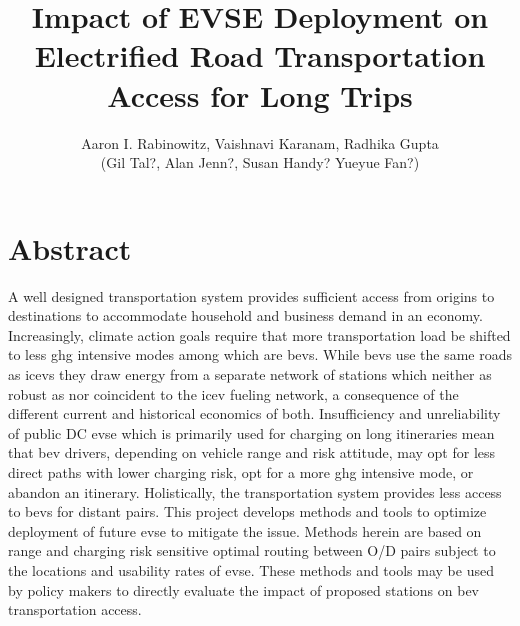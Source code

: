 \documentclass[11pt]{article}
\title{Impact of EVSE Deployment on Electrified Road Transportation Access for Long Trips}
\author{Aaron I. Rabinowitz, Vaishnavi Karanam, Radhika Gupta\\(Gil Tal?, Alan Jenn?, Susan Handy? Yueyue Fan?)}
\date{}
\begin{document}
\maketitle

\section*{Abstract}

A well designed transportation system provides sufficient access from origins to destinations to accommodate household and business demand in an economy.  Increasingly, climate action goals require that more transportation load be shifted to less \gls{ghg} intensive modes among which are \glspl{bev}. While \glspl{bev} use the same roads as \glspl{icev} they draw energy from a separate network of stations which neither as robust as nor coincident to the \gls{icev} fueling network, a consequence of the different current and historical economics of both. Insufficiency and unreliability of public DC \gls{evse} which is primarily used for charging on long itineraries mean that \gls{bev} drivers, depending on vehicle range and risk attitude, may opt for less direct paths with lower charging risk, opt for a more \gls{ghg} intensive mode, or abandon an itinerary. Holistically, the transportation system provides less access to \glspl{bev} for distant pairs. This project develops methods and tools to optimize deployment of future \gls{evse} to mitigate the issue. Methods herein are based on range and charging risk sensitive optimal routing between O/D pairs subject to the locations and usability rates of \gls{evse}. These methods and tools may be used by policy makers to directly evaluate the impact of proposed stations on \gls{bev} transportation access.
\medskip
\end{document}
